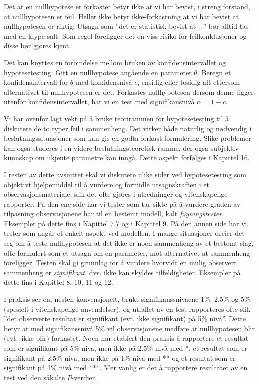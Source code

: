 Det at en nullhypotese er forkastet betyr ikke at vi har bevist,
i streng forstand, at nullhypotesen er feil. Heller ikke betyr
ikke-forkastning at vi har bevist at nullhypotesen er riktig.
Utsagn som ''det er statistisk bevist at ...'' bør alltid tas med
en klype salt. Som regel foreligger det en viss risiko for
feilkonklusjoner og disse bør gjøres kjent.


Det kan knyttes en forbindelse mellom bruken av
konfidensintervallet og hypotesetesting: Gitt en nullhypotese
angående en parameter $\theta$. Beregn et konfidensintervall for
$\theta$ med konfidensnivå $c$, ensidig eller tosidig alt
ettersom alternativet til nullhypotesen er det. Forkastes
nullhypotesen dersom denne ligger utenfor konfidensintervallet,
har vi en test med signifikansnivå $\alpha = 1 - c$.

Vi har ovenfor lagt vekt på å bruke teorirammen for
hypotesetesting til å diskutere de to typer feil i sammenheng.
Det virker både naturlig og nødvendig i beslutningssituasjoner
som kan gis en godta-forkast for\-mule\-ring. Slike problemer kan
også studeres i en videre beslutningsteoretisk ramme, der også
subjektiv kunnskap om ukjente parametre kan inngå. Dette aspekt
forfølges i Kapittel 16.

I resten av dette avsnittet skal vi
diskutere ulike sider ved hypotesetesting som objektivt
hjelpemiddel til å vurdere og formidle utsagnskraften i et
observasjonsmateriale, slik det ofte gjøres i utredninger og
vitenskapelige rapporter. På den ene side har vi tester som tar
sikte på å vurdere graden av tilpasning observasjonene har til
en bestemt modell, kalt {\em føyningstester}. Eksempler på
dette fins i Kapittel 7.7 og i Kapittel 9. På den annen side
har vi tester som angår et enkelt aspekt ved modellen. I mange
situasjoner dreier det seg om å teste nullhypotesen at det ikke
er noen sammenheng av et bestemt slag, ofte formulert som et
utsagn om en parameter, mot alternativet at sammenheng
foreligger. Testen skal gi grunnlag for å vurdere hvorvidt en
mulig observert sammenheng er {\em signifikant}, dvs. ikke kan
skyldes tilfeldigheter. Eksempler på dette fins i Kapittel 8, 10,
11 og 12.

I praksis ser en, nesten konvensjonelt, brukt
signifikanssnivåene 1\%, 2.5\% og 5\% (spesielt i vitenskapelige
anvendelser), og utfallet av en test rapporteres ofte slik ''det
observerte resultat er signifikant (evt. ikke signifikant) på 5\%
nivå''. Dette betyr at med signifikanssnivå 5\% vil
observasjonene medføre at nullhypotesen blir (evt.\ ikke blir)
forkastet. Noen har etablert den praksis å rapportere et resultat
som er signifikant på 5\% nivå, men ikke på 2.5\% nivå med *,
et resultat som er signifikant på 2.5\% nivå, men ikke på
1\% nivå med ** og
et resultat som er signifikant på 1\% nivå med ***. Mer vanlig er det
å rapportere resultatet av en test ved den såkalte $P$-verdien.

